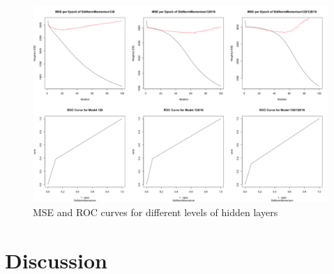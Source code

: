 \documentclass[11.5pt]{article}
\newcounter{graphics}
\begin{document}
\begin{figure}[h!]
  \includegraphics[width=1\textwidth]{report_mlp/different_layers_MSE_ROC.png}
    \caption{\small MSE and ROC curves for different levels of hidden layers}
    \label{different_layers_MSE_ROC.png}
\end{figure}



\section{Discussion}


{}
\end{document}
